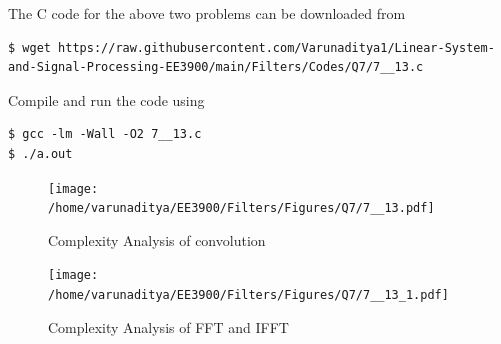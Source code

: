 \documentclass[journal,12pt,twocolumn]{IEEEtran}
\renewcommand\thesection{\arabic{section}}
\begin{document}
\begin{enumerate}[label=\thesection.\arabic*.,ref=\thesection.\theenumi]
\solution The C code for the above two problems can be downloaded from
\begin{lstlisting}
$ wget https://raw.githubusercontent.com/Varunaditya1/Linear-System-and-Signal-Processing-EE3900/main/Filters/Codes/Q7/7__13.c
\end{lstlisting}
Compile and run the code using
\begin{lstlisting}
$ gcc -lm -Wall -O2 7__13.c
$ ./a.out
\end{lstlisting}
\begin{figure}[!ht]
\centering
\texttt{[image: /home/varunaditya/EE3900/Filters/Figures/Q7/7\_\_13.pdf]}
\caption{Complexity Analysis of convolution}
\texttt{[image: /home/varunaditya/EE3900/Filters/Figures/Q7/7\_\_13\_1.pdf]}
\caption{Complexity Analysis of FFT and IFFT}
\end{figure} 
\end{enumerate}
\end{document}
